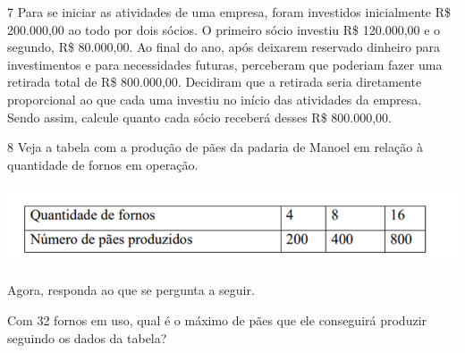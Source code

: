\begin{mdframed}[linewidth=2pt,linecolor=salmao,roundcorner=2pt]
\begin{escolha}
{\begin{escolha}

\num{7} Para se iniciar as atividades de uma empresa, foram investidos
inicialmente R\$ 200.000,00 ao todo por dois sócios. O primeiro
sócio investiu R\$ 120.000,00 e o segundo, R\$ 80.000,00. Ao final do ano,
após deixarem reservado dinheiro para investimentos e para necessidades
futuras, perceberam que poderiam fazer uma retirada total de R\$ 800.000,00. Decidiram que a retirada seria diretamente proporcional ao que
cada uma investiu no início das atividades da empresa. Sendo assim,
calcule quanto cada sócio receberá desses R\$ 800.000,00.

\begin{mdframed}[linewidth=2pt,linecolor=salmao,roundcorner=2pt]





\vspace{2cm}
\end{mdframed}

\num{8} Veja a tabela com a produção de pães da padaria de Manoel em relação à quantidade de fornos em operação.


\includegraphics[width=5.90556in,height=0.92222in]{media/image131.png}

Agora, responda ao que se pergunta a seguir.

\begin{escolha}
\item
  Com 32 fornos em uso, qual é o máximo de pães que ele conseguirá
  produzir seguindo os dados da tabela?


\end{escolha}
\end{escolha}}
\end{escolha}
\end{mdframed}
